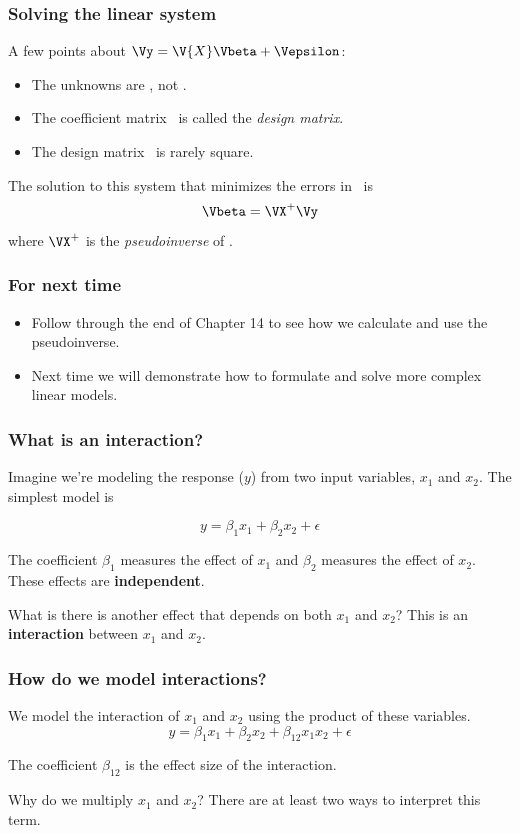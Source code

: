 \documentclass{beamer}
\begin{document}
\begin{frame}
\frametitle{Solving the linear system}

A few points about $\Vy = \V{X}\Vbeta+\Vepsilon$:
\begin{itemize}
	\item The unknowns are \Vbeta, not .
	\item The coefficient matrix \ is called the \emph{design matrix}.
	\item The design matrix \ is rarely square.
\end{itemize}

\pause
The solution to this system that minimizes the errors in \Vepsilon\ is 
\[ \Vbeta = \VX^+\Vy \]
where $\VX^+$ is the \emph{pseudoinverse} of \VX.
\end{frame}

\begin{frame}
\frametitle{For next time}
\begin{itemize}
	\item Follow through the end of Chapter 14 to see how we calculate and use the pseudoinverse.
	\item Next time we will demonstrate how to formulate and solve more complex linear models.
\end{itemize}	
\end{frame}

\begin{frame}
\frametitle{What is an interaction?}	

Imagine we're modeling the response ($y$) from two input variables, $x_1$ and $x_2$. The simplest model is

\[ y = \beta_1x_1 + \beta_2x_2 + \epsilon \]

\pause
The coefficient $\beta_1$ measures the effect of $x_1$ and $\beta_2$ measures the effect of $x_2$. These effects are \textbf{independent}.

\bigskip
\pause
What is there is another effect that depends on both $x_1$ and $x_2$? This is an \textbf{interaction} between $x_1$ and $x_2$.
\end{frame}

\begin{frame}
\frametitle{How do we model interactions?}

We model the interaction of $x_1$ and $x_2$ using the product of these variables.
\[ y = \beta_1x_1 + \beta_2x_2 + \beta_{12}x_1x_2 + \epsilon \]

The coefficient $\beta_{12}$ is the effect size of the interaction.

\pause
\bigskip
Why do we multiply $x_1$ and $x_2$? There are at least two ways to interpret this term.
\end{frame}
\end{document}
